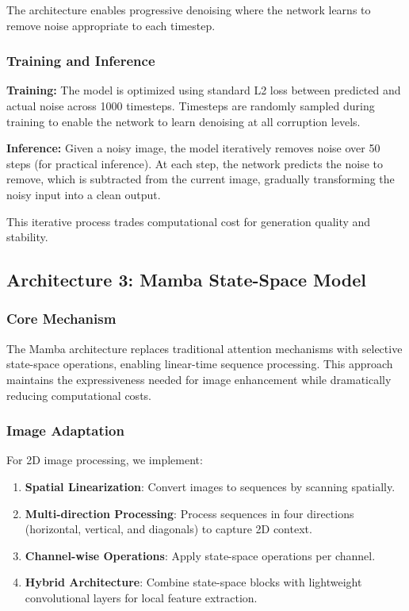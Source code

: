 \documentclass[10pt,conference,letterpaper]{IEEEtran}
\begin{document}
The architecture enables progressive denoising where the network learns to remove noise appropriate to each timestep.

\subsubsection{Training and Inference}

\textbf{Training:} The model is optimized using standard L2 loss between predicted and actual noise across 1000 timesteps. Timesteps are randomly sampled during training to enable the network to learn denoising at all corruption levels.

\textbf{Inference:} Given a noisy image, the model iteratively removes noise over 50 steps (for practical inference). At each step, the network predicts the noise to remove, which is subtracted from the current image, gradually transforming the noisy input into a clean output.

This iterative process trades computational cost for generation quality and stability.

\subsection{Architecture 3: Mamba State-Space Model}
\label{subsec:mamba}

\subsubsection{Core Mechanism}

The Mamba architecture replaces traditional attention mechanisms with selective state-space operations, enabling linear-time sequence processing. This approach maintains the expressiveness needed for image enhancement while dramatically reducing computational costs.

\subsubsection{Image Adaptation}

For 2D image processing, we implement:

\begin{enumerate}
  \item \textbf{Spatial Linearization}: Convert images to sequences by scanning spatially.
  
  \item \textbf{Multi-direction Processing}: Process sequences in four directions (horizontal, vertical, and diagonals) to capture 2D context.
  
  \item \textbf{Channel-wise Operations}: Apply state-space operations per channel.
  
  \item \textbf{Hybrid Architecture}: Combine state-space blocks with lightweight convolutional layers for local feature extraction.
\end{enumerate}
\end{document}
